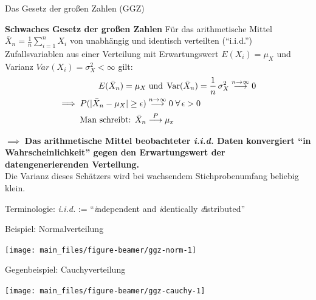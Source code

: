 \documentclass[
  10pt,
  ignorenonframetext,
]{beamer}
\begin{document}
\begin{frame}{Das Gesetz der großen Zahlen (GGZ)}
\label{das-gesetz-der-grouxdfen-zahlen-ggz}
\begin{block}{\textbf{Schwaches Gesetz der großen Zahlen}}
\label{schwaches-gesetz-der-grouxdfen-zahlen}
Für das arithmetische Mittel
\(\bar{X}_n = \frac{1}{n} \sum_{i = 1}^n X_i\) von unabhängig und
identisch verteilten (``i.i.d.'') Zufallsvariablen aus einer Verteilung
mit Erwartungswert \(E(X_i) = \mu_X\) und Varianz
\(Var(X_i) = \sigma_X^2 < \infty\) gilt: \begin{align*}
E(\bar{X}_n) = \mu_X &\;\text{und}\; \operatorname{Var}(\bar{X}_n) = \frac{1}{n} \, \sigma_X^2 \stackrel{n\to\infty}{\longrightarrow} 0\\
\implies P(|\bar{X}_n - \mu_X| \geq \epsilon) &\stackrel{n\to\infty}{\longrightarrow} 0 \;\forall\, \epsilon > 0\\
\text{Man schreibt: } \bar{X}_n &\stackrel{P}{\longrightarrow} \mu_x
\end{align*}
\end{block}

\(\implies\) \textbf{Das arithmetische Mittel beobachteter \emph{i.i.d.}
Daten konvergiert ``in Wahrscheinlichkeit'' gegen den Erwartungswert der
datengenerierenden Verteilung.}\\
Die Varianz dieses Schätzers wird bei wachsendem Stichprobenumfang
beliebig klein.

\scriptsize Terminologie: \emph{i.i.d.} := ``\emph{i}ndependent and
\emph{i}dentically \emph{d}istributed''
\end{frame}

\begin{frame}{Beispiel: Normalverteilung}
\label{beispiel-normalverteilung}
\scriptsize\normalsize
\scriptsize

\begin{center}\texttt{[image: main\_files/figure-beamer/ggz-norm-1]} \end{center}

\normalsize
\end{frame}

\begin{frame}{Gegenbeispiel: Cauchyverteilung}
\label{gegenbeispiel-cauchyverteilung}
\scriptsize

\begin{center}\texttt{[image: main\_files/figure-beamer/ggz-cauchy-1]} \end{center}

\normalsize
\end{frame}
\end{document}
